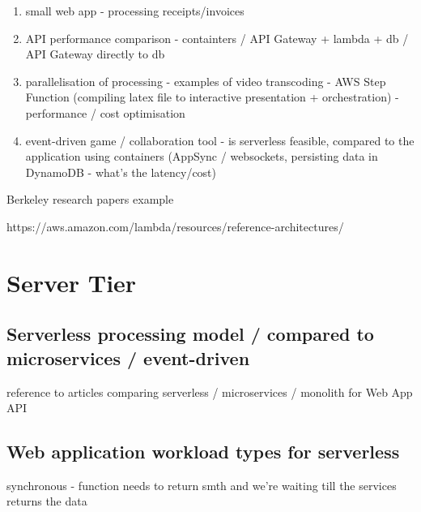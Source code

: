 \begin{enumerate}
    \item small web app - processing receipts/invoices
    \item API performance comparison - containters / API Gateway + lambda + db / API Gateway directly to db
    \item parallelisation of processing - examples of video transcoding - AWS Step Function (compiling latex file to interactive presentation + orchestration) - performance / cost optimisation
    \item event-driven game / collaboration tool - is serverless feasible, compared to the application using containers (AppSync / websockets, persisting data in DynamoDB - what's the latency/cost)
\end{enumerate}

Berkeley research papers example
    
https://aws.amazon.com/lambda/resources/reference-architectures/

\section{Server Tier}

\subsection{Serverless processing model / compared to microservices / event-driven}


reference to articles comparing serverless / microservices / monolith for Web App API

\subsection{Web application workload types for serverless}


synchronous - function needs to return smth and we're waiting till the services returns the data

